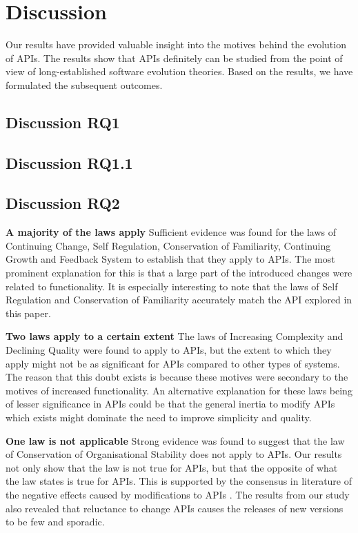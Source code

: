 \documentclass{sig-alternate}
\begin{document}
\section{Discussion} \label{discussion}
Our results have provided valuable insight into the motives behind the evolution of APIs. The results show that APIs definitely can be studied from the point of view of long-established software evolution theories. Based on the results, we have formulated the subsequent outcomes. 

\subsection{Discussion RQ1}  




\subsection{Discussion RQ1.1}



\subsection{Discussion RQ2}

\noindent
\textbf{A majority of the laws apply  } %
Sufficient evidence was found for the laws of Continuing Change, Self Regulation, Conservation of Familiarity, Continuing Growth and Feedback System to establish that they apply to APIs. The most prominent explanation for this is that a large part of the introduced changes were related to functionality. It is especially interesting to note that the laws of Self Regulation and Conservation of Familiarity accurately match the API explored in this paper. 

\smallskip \noindent
\textbf{Two laws apply to a certain extent  } %
The laws of Increasing Complexity and Declining Quality were found to apply to APIs, but the extent to which they apply might not be as significant for APIs compared to other types of systems. The reason that this doubt exists is because these motives were secondary to the motives of increased functionality. An alternative explanation for these laws being of lesser significance in APIs could be that the general inertia to modify APIs which exists \cite{google_talk} \cite{henning2007api} \cite{mcdonnell2013empirical} \cite{robbes2012developers} might dominate the need to improve simplicity and quality. 

\smallskip \noindent
\textbf{One law is not applicable  } %
Strong evidence was found to suggest that the law of Conservation of Organisational Stability does not apply to APIs. Our results not only show that the law is not true for APIs, but that the opposite of what the law states is true for APIs. This is supported by the consensus in literature of the negative effects caused by modifications to APIs \cite{google_talk} \cite{henning2007api} \cite{mcdonnell2013empirical} \cite{robbes2012developers}. The results from our study also revealed that reluctance to change APIs causes the releases of new versions to be few and sporadic. 
\end{document}
